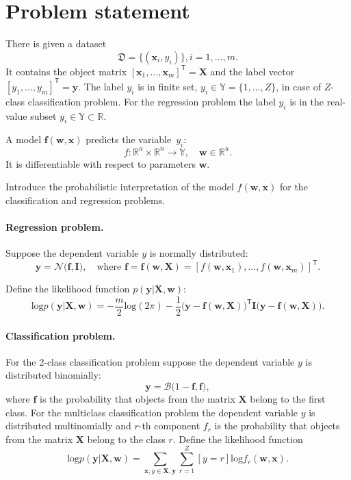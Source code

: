 \documentclass[smallcondensed]{svjour3}
\begin{document}
\section{Problem statement}
\label{prob_stat}
There is given a dataset \begin{equation}\label{eq:dataset}\mathfrak{D} = \{(\mathbf{x}_i,y_i)\}, i = 1,\dots,m.\end{equation} It contains the object matrix $[\mathbf{x}_1, \dots, \mathbf{x}_m]^\mathsf{T} =  \mathbf{X}$ and the label vector  $[y_1, \dots, y_m]^\mathsf{T} = \mathbf{y}$. The label  ${y_i}$ is in finite set, ${y}_i \in \mathbb{Y} = \{1, \dots, Z\}$, in case of $Z$-class classification problem. For the regression problem the label $y_i$ is in the real-value subset ${y_i} \in \mathbb{Y} \subset  \mathbb{R}$.

A model $\mathbf{f}(\mathbf{w}, \mathbf{x})$ predicts the variable~$y_i$:
\[
	f:\mathbb{R}^u \times \mathbb{R}^n \to \mathbb{Y}, \quad \mathbf{w} \in \mathbb{R}^u.
\]
It is differentiable with respect to parameters $\mathbf{w}$.

Introduce the probabilistic interpretation of the model ${f}(\mathbf{w}, \mathbf{x})$ for the classification and regression problems.

\paragraph{Regression problem.}
Suppose the dependent variable $y$ is normally distributed:
\begin{equation}
\label{eq:reg}
\mathbf{y} = \mathcal{N}\bigl(\mathbf{f}, \mathbf{I}\bigr),\quad \text{where }\mathbf{f} = \mathbf{f}(\mathbf{w}, \mathbf{X}) = [f(\mathbf{w}, \mathbf{x}_1),\dots,f(\mathbf{w}, \mathbf{x}_m)]^\mathsf{T}.
\end{equation}


Define the likelihood function $p(\mathbf{y}|\mathbf{X}, \mathbf{w})$:
\[
	\text{log}p(\mathbf{y}|\mathbf{X}, \mathbf{w}) =-\frac{m}{2}\text{log}(2\pi)   -\frac{1}{2}\bigl(\mathbf{y} - \mathbf{f}(\mathbf{w}, \mathbf{X}))^\mathsf{T}\mathbf{I}(\mathbf{y} - \mathbf{f}(\mathbf{w}, \mathbf{X})\bigr).
\] 

\paragraph{Classification problem.}
For the 2-class classification problem suppose the dependent variable $y$  is distributed binomially:
\begin{equation}
\label{eq:cl}
	\mathbf{y} = \mathcal{B}\bigl(1-\mathbf{f}, \mathbf{f}\bigr),
\end{equation}
where  $\mathbf{f}$ is the probability that objects from the matrix $\mathbf{X}$  belong to the first class.
For the multiclass classification problem the  dependent variable $y$  is distributed multinomially and $r$-th component ${f}_r$ is the probability that objects from the matrix $\mathbf{X}$  belong to the class $r$. Define the likelihood function
\[
	\text{log}p(\mathbf{y}|\mathbf{X}, \mathbf{w}) = \sum_{\mathbf{x}, y \in \mathbf{X}, \mathbf{y}} \sum_{r=1}^Z[y=r] \text{log}{f}_r(\mathbf{w}, \mathbf{x}).
\] 
\end{document}
